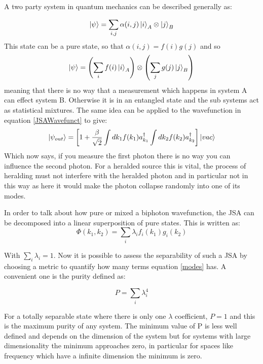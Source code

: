 A two party system in quantum mechanics can be described generally as:

\begin{equation}
\ket{\psi} = \sum_{i,j}\alpha(i,j)\ket{i}_A\otimes\ket{j}_B 
\end{equation}
\noindent
This state can be a pure state, so that $\alpha(i,j)=f(i)g(j)$ and so
\begin{equation}
\ket{\psi} = \left (\sum_{i}f(i)\ket{i}_A \right ) \otimes \left (\sum_{j}g(j)\ket{j}_B \right )
\end{equation}
meaning that there is no way that a measurement which happens in system A can effect system B. Otherwise it is in an entangled state and the sub systems act as statistical mixtures. The same idea can be applied to the wavefunction in equation \ref{JSAWavefunct} to give:
\begin{equation}
\ket{\psi_{out}}=\left [1 + \frac{\beta}{\sqrt{2}}\int dk_1f(k_1)a_{k_1}^{\dagger} \int dk_2f(k_2)a_{k_2}^{\dagger} \right ]\ket{vac}
\end{equation}
Which now says, if you measure the first photon there is no way you can influence the second photon. For a heralded source this is vital, the process of heralding must not interfere with the heralded photon and in particular not in this way as here it would make the photon collapse randomly into one of its modes.




In order to talk about how pure or mixed a biphoton wavefunction, the JSA can be decomposed into a linear superposition of pure states. This is written as\cite{harder_optimized_2013}:
\begin{equation} \label{modes}
	\Phi(k_1,k_2) = \sum_i \lambda_if_i(k_1)g_i(k_2)
\end{equation}

With $\sum_i \lambda_i=1$. Now it is possible to assess the separability of such a JSA by choosing a metric to quantify how many terms  equation \ref{modes} has. A convenient one is the purity defined as: 

\begin{equation} \label{purityEqn1}
	P = \sum_i \lambda_i^4
\end{equation}

For a totally separable state where there is only one $\lambda$ coefficient, $P=1$ and this is the maximum purity of any system. The minimum value of P is less well defined and depends on the dimension of the system but for systems with large dimensionality the minimum approaches zero, in particular for spaces like frequency which have a infinite dimension the minimum is zero. 

